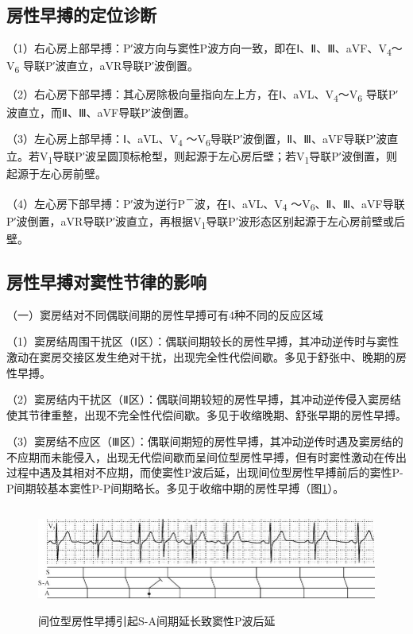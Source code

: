 \protect\hypertarget{text00018.htmlux5cux23subid136}{}{}

\subsection{房性早搏的定位诊断}

（1）右心房上部早搏：P′波方向与窦性P波方向一致，即在Ⅰ、Ⅱ、Ⅲ、aVF、V\textsubscript{4}～V\textsubscript{6} 导联P′波直立，aVR导联P′波倒置。

（2）右心房下部早搏：其心房除极向量指向左上方，在Ⅰ、aVL、V\textsubscript{4}～V\textsubscript{6} 导联P′波直立，而Ⅱ、Ⅲ、aVF导联P′波倒置。

（3）左心房上部早搏：Ⅰ、aVL、V\textsubscript{4} ～V\textsubscript{6}导联P′波倒置，Ⅱ、Ⅲ、aVF导联P′波直立。若V\textsubscript{1}导联P′波呈圆顶标枪型，则起源于左心房后壁；若V\textsubscript{1}导联P′波倒置，则起源于左心房前壁。

（4）左心房下部早搏：P′波为逆行P\textsuperscript{－}波，在Ⅰ、aVL、V\textsubscript{4} ～V\textsubscript{6}、Ⅱ、Ⅲ、aVF导联P′波倒置，aVR导联P′波直立，再根据V\textsubscript{1}导联P′波形态区别起源于左心房前壁或后壁。

\protect\hypertarget{text00018.htmlux5cux23subid137}{}{}

\subsection{房性早搏对窦性节律的影响}

（一）窦房结对不同偶联间期的房性早搏可有4种不同的反应区域

（1）窦房结周围干扰区（Ⅰ区）：偶联间期较长的房性早搏，其冲动逆传时与窦性激动在窦房交接区发生绝对干扰，出现完全性代偿间歇。多见于舒张中、晚期的房性早搏。

（2）窦房结内干扰区（Ⅱ区）：偶联间期较短的房性早搏，其冲动逆传侵入窦房结使其节律重整，出现不完全性代偿间歇。多见于收缩晚期、舒张早期的房性早搏。

（3）窦房结不应区（Ⅲ区）：偶联间期短的房性早搏，其冲动逆传时遇及窦房结的不应期而未能侵入，出现无代偿间歇而呈间位型房性早搏，但有时窦性激动在传出过程中遇及其相对不应期，而使窦性P波后延，出现间位型房性早搏前后的窦性P-P间期较基本窦性P-P间期略长。多见于收缩中期的房性早搏（图\ref{fig11-6}）。

\begin{figure}[!htbp]
 \centering
 \includegraphics[width=5.73958in,height=1.34375in]{./images/Image00158.jpg}
 \captionsetup{justification=centering}
 \caption{间位型房性早搏引起S-A间期延长致窦性P波后延}
 \label{fig11-6}
  \end{figure} 

